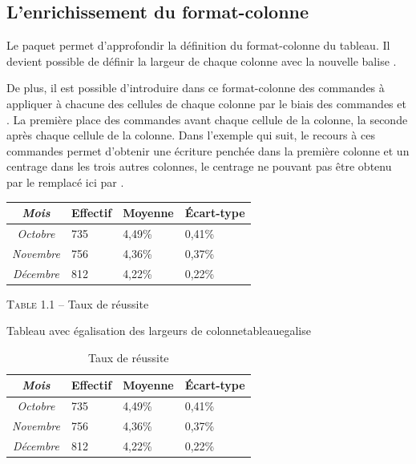 \subsection{L'enrichissement du format-colonne}

Le paquet  permet d'approfondir la définition du format-colonne du tableau. Il devient possible de définir la largeur de chaque colonne avec la nouvelle balise . 

De plus, il est possible d'introduire dans ce format-colonne des  commandes à appliquer à chacune des cellules de chaque colonne par le biais des commandes  et . La première place des commandes avant chaque cellule de la colonne, la seconde après chaque cellule de la colonne. Dans l'exemple qui suit, le recours à ces commandes permet d'obtenir une écriture penchée dans la première colonne et un centrage dans les trois autres colonnes, le centrage ne pouvant pas être obtenu par le  remplacé ici par .

\begin{codedoublevrai}
\centering
\begin{tabular}{|>{\slshape}c||m{2cm}<{\centering}|m{2cm}<{\centering}|
m{2cm}<{\centering}|}
\hline 
Mois            & Effectif     & Moyenne   & \'{E}cart-type  \\ \hline \hline
Octobre         & 735          & 4,49\%    & 0,41\%          \\ \hline
Novembre        & 756          & 4,36\%    & 0,37\%          \\ \hline
Décembre        & 812          & 4,22\%    & 0,22\%          \\ \hline
\end{tabular}
\par\vspace{0.8\baselineskip} \textsc{Table 1.1} -- Taux de réussite
\end{codedoublevrai}

\begin{codedoublefaux}{Tableau avec égalisation des largeurs de colonne}{tableauegalise}
\begin{table}[!ht]
\centering
\begin{tabular}{|>{\slshape}c||m{2cm}<{\centering}|m{2cm}<{\centering}|
m{2cm}<{\centering}|}
\hline 
Mois            & Effectif     & Moyenne   & \'{E}cart-type  \\ \hline \hline
Octobre         & 735          & 4,49\%    & 0,41\%          \\ \hline
Novembre        & 756          & 4,36\%    & 0,37\%          \\ \hline
Décembre        & 812          & 4,22\%    & 0,22\%          \\ \hline
\end{tabular}
\caption{Taux de réussite}
\end{table}
\end{codedoublefaux}


